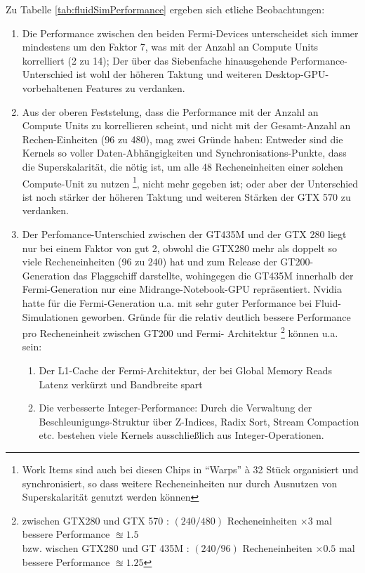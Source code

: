 	Zu Tabelle \ref{tab:fluidSimPerformance} ergeben sich etliche Beobachtungen:
	\begin{enumerate}
		\item Die Performance zwischen den beiden Fermi-Devices unterscheidet sich immer mindestens um den Faktor 7,
		was mit der Anzahl an Compute Units korrelliert (2 zu 14); Der über das Siebenfache hinausgehende
		Performance-Unterschied ist wohl der höheren Taktung und weiteren Desktop-GPU- vorbehaltenen Features zu verdanken.
		\item Aus der oberen Feststelung, dass die Performance mit der Anzahl an Compute Units zu korrellieren scheint,
		und nicht mit der Gesamt-Anzahl an Rechen-Einheiten (96 zu 480), mag zwei Gründe haben: Entweder sind die
		Kernels so voller Daten-Abhängigkeiten und Synchronisations-Punkte, dass die Superskalarität, die nötig ist, um 
		alle 48 Recheneinheiten einer solchen Compute-Unit zu nutzen \footnote{Work Items sind auch bei diesen Chips in 
		"`Warps"' à 32 Stück organisiert und synchronisiert, so dass weitere Recheneinheiten nur durch Ausnutzen von 
		Superskalarität	genutzt werden können}, nicht mehr gegeben ist;
		oder aber der Unterschied ist noch stärker der höheren Taktung und weiteren Stärken der GTX 570 zu verdanken.
		\item Der Perfomance-Unterschied zwischen der GT435M und der GTX 280 liegt nur bei einem Faktor von gut 2,
		obwohl die GTX280 mehr als doppelt so viele Recheneinheiten (96 zu 240) hat und zum Release der GT200-Generation
		das Flaggschiff darstellte, wohingegen die GT435M innerhalb der Fermi-Generation nur eine Midrange-Notebook-GPU
		repräsentiert. Nvidia hatte für die Fermi-Generation u.a. mit sehr guter Performance bei Fluid-Simulationen
		geworben. Gründe für die relativ deutlich bessere Performance pro Recheneinheit zwischen GT200 und Fermi-
		Architektur 
		\footnote{
			zwischen GTX280 und GTX 570 :  
			$(240/480)$ Recheneinheiten $ \times 3 $ mal bessere Performance $ \approxeq 1.5 $ \\
			bzw. wischen GTX280 und GT 435M :  
			$(240/96)$ Recheneinheiten $ \times 0.5 $ mal bessere Performance $ \approxeq 1.25 $
		} können u.a. sein:
		\begin{enumerate}
			\item Der L1-Cache der Fermi-Architektur, der bei Global Memory Reads Latenz verkürzt und Bandbreite spart
			\item Die verbesserte Integer-Performance: Durch die Verwaltung der Beschleunigungs-Struktur über Z-Indices,
			Radix Sort, Stream Compaction etc. bestehen viele Kernels ausschließlich aus Integer-Operationen.

\end{enumerate}
\end{enumerate}
